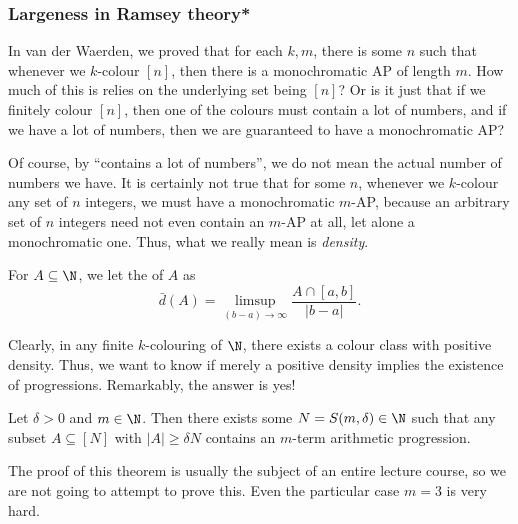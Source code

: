 \documentclass[a4paper]{article}
\begin{document}
\subsubsection*{Largeness in Ramsey theory*}
In van der Waerden, we proved that for each $k, m$, there is some $n$ such that whenever we $k$-colour $[n]$, then there is a monochromatic AP of length $m$. How much of this is relies on the underlying set being $[n]$? Or is it just that if we finitely colour $[n]$, then one of the colours must contain a lot of numbers, and if we have a lot of numbers, then we are guaranteed to have a monochromatic AP?

Of course, by ``contains a lot of numbers'', we do not mean the actual number of numbers we have. It is certainly not true that for some $n$, whenever we $k$-colour any set of $n$ integers, we must have a monochromatic $m$-AP, because an arbitrary set of $n$ integers need not even contain an $m$-AP at all, let alone a monochromatic one. Thus, what we really mean is \emph{density}.
%
%
%
%
%
\begin{defi}[Density]
 For $A \subseteq \N$, we let the  of $A$ as
 \[
   \bar{d}(A) = \limsup_{(b - a) \to \infty} \frac{A \cap [a, b]}{|b - a|}.
 \]
\end{defi}
Clearly, in any finite $k$-colouring of $\N$, there exists a colour class with positive density. Thus, we want to know if merely a positive density implies the existence of progressions. Remarkably, the answer is yes!

\begin{thm}
  Let $\delta > 0$ and $m \in \N$. Then there exists some $N = S(m, \delta) \in \N$ such that any subset $A \subseteq [N]$ with $|A| \geq \delta N$ contains an $m$-term arithmetic progression.
\end{thm}
The proof of this theorem is usually the subject of an entire lecture course, so we are not going to attempt to prove this. Even the particular case $m = 3$ is very hard.
\end{document}
